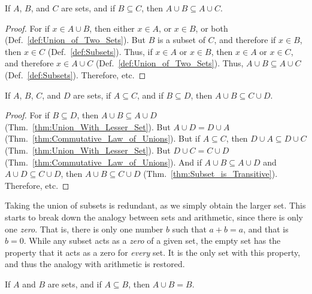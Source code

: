         \begin{theorem}
            \label{thm:Union_With_Lesser_Set}%
            If $A$, $B$, and $C$ are sets, and if
            $B\subseteq{C}$, then
            $A\cup{B}\subseteq{A}\cup{C}$.
        \end{theorem}
        \begin{proof}
            For if $x\in{A}\cup{B}$, then either $x\in{A}$,
            or $x\in{B}$, or both
            (Def.~\ref{def:Union_of_Two_Sets}). But $B$ is a
            subset of $C$, and therefore if $x\in{B}$, then
            $x\in{C}$ (Def.~\ref{def:Subsets}).
            Thus, if $x\in{A}$ or $x\in{B}$, then
            $x\in{A}$ or $x\in{C}$, and therefore
            $x\in{A}\cup{C}$ (Def.~\ref{def:Union_of_Two_Sets}).
            Thus, $A\cup{B}\subseteq{A}\cup{C}$
            (Def.~\ref{def:Subsets}). Therefore, etc.
        \end{proof}
        \begin{theorem}
            If $A$, $B$, $C$, and $D$ are sets, if
            $A\subseteq{C}$, and if $B\subseteq{D}$, then
            $A\cup{B}\subseteq{C}\cup{D}$.
        \end{theorem}
        \begin{proof}
            For if $B\subseteq{D}$, then
            $A\cup{B}\subseteq{A}\cup{D}$
            (Thm.~\ref{thm:Union_With_Lesser_Set}).
            But $A\cup{D}=D\cup{A}$
            (Thm.~\ref{thm:Commutative_Law_of_Unions}).
            But if $A\subseteq{C}$, then
            $D\cup{A}\subseteq{D}\cup{C}$
            (Thm.~\ref{thm:Union_With_Lesser_Set}). But
            $D\cup{C}=C\cup{D}$
            (Thm.~\ref{thm:Commutative_Law_of_Unions}).
            And if $A\cup{B}\subseteq{A}\cup{D}$ and
            $A\cup{D}\subseteq{C}\cup{D}$, then
            $A\cup{B}\subseteq{C}\cup{D}$
            (Thm.~\ref{thm:Subset_is_Transitive}).
            Therefore, etc.
        \end{proof}
        Taking the union of subsets is redundant, as we simply obtain the larger
        set. This starts to break down the analogy between sets and arithmetic,
        since there is only one \textit{zero}. That is, there is only one number
        $b$ such that $a+b=a$, and that is $b=0$. While any subset acts as a
        \textit{zero} of a given set, the empty set has the property that it
        acts as a zero for \textit{every} set. It is the only set with this
        property, and thus the analogy with arithmetic is restored.
        \begin{theorem}
            \label{thm:Union_With_Subset}%
            If $A$ and $B$ are sets, and if $A\subseteq{B}$, then $A\cup{B}=B$.
        \end{theorem}
